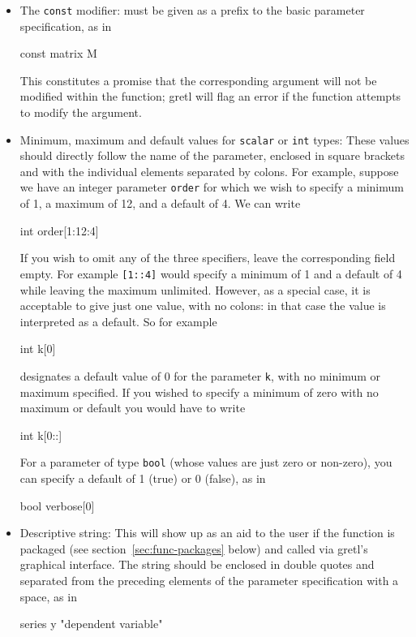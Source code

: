 \begin{itemize}

\item The \texttt{const} modifier: must be given as a prefix to the
  basic parameter specification, as in
%    
\begin{code}
const matrix M
\end{code} 
%
This constitutes a promise that the corresponding argument will not be
modified within the function; gretl will flag an error if
the function attempts to modify the argument.

\item Minimum, maximum and default values for \texttt{scalar} or
  \texttt{int} types: These values should directly follow the name of
  the parameter, enclosed in square brackets and with the individual
  elements separated by colons.  For example, suppose we have an
  integer parameter \texttt{order} for which we wish to specify a
  minimum of 1, a maximum of 12, and a default of 4.  We can write
%    
\begin{code}
int order[1:12:4]
\end{code} 
%
If you wish to omit any of the three specifiers, leave the
corresponding field empty.  For example \texttt{[1::4]} would specify
a minimum of 1 and a default of 4 while leaving the maximum
unlimited. However, as a special case, it is acceptable to give just
one value, with no colons: in that case the value is interpreted as a
default. So for example
%    
\begin{code}
int k[0]
\end{code}
%
designates a default value of 0 for the parameter \texttt{k}, with no
minimum or maximum specified. If you wished to specify a minimum of
zero with no maximum or default you would have to write
%    
\begin{code}
int k[0::]
\end{code}

For a parameter of type \texttt{bool} (whose values are just zero or
non-zero), you can specify a default of 1 (true) or 0 (false), as in
%    
\begin{code}
bool verbose[0]
\end{code} 

\item Descriptive string: This will show up as an aid to the user if
  the function is packaged (see section~\ref{sec:func-packages} below)
  and called via gretl's graphical interface.  The string should
  be enclosed in double quotes and separated from the preceding
  elements of the parameter specification with a space, as in
%
\begin{code}
series y "dependent variable"
\end{code} 


\end{itemize}
